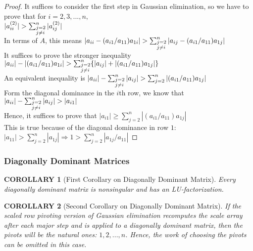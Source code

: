 \documentclass[notheorems,mathserif,table,compress]{beamer}  %
\begin{document}
\begin{frame}
\begin{proof}
It suffices to consider the first step in Gaussian elimination, so we have to prove that for $i=2,3,...,n,$\\
$|a_{ii}^{(2)}|>\sum_{\begin{subarray}{l}
{j=2}\\
j\neq i
\end{subarray}}^n|a_{ij}^{(2)}|$ \\
In terms of $A$, this means $|a_{ii}-(a_{i1}/a_{11})a_{1i}|>\sum_{\begin{subarray}{l}
{j=2}\\
j\neq i
\end{subarray}}^n|a_{ij}-(a_{i1}/a_{11})a_{1j}|$\\
It suffices to prove the stronger inequality $|a_{ii}|-|(a_{i1}/a_{11})a_{1i}|>\sum_{\begin{subarray}{l}
{j=2}\\
j\neq i
\end{subarray}}^n\lbrace|a_{ij}|+|(a_{i1}/a_{11})a_{1j}|\rbrace$\\
An equivalent inequality is $|a_{ii}|-\sum_{\begin{subarray}{l}
{j=2}\\
j\neq i
\end{subarray}}^n|a_{ij}|>\sum_{j=2}^n|(a_{i1}/a_{11})a_{1j}|$\\
Form the diagonal dominance in the $i$th row, we know that $|a_{ii}|-\sum_{\begin{subarray}{l}
{j=2}\\
j\neq i
\end{subarray}}^n|a_{ij}|>|a_{i1}|$\\
Hence, it suffices to prove that $|a_{i1}|\geq\sum_{j=2}^n|(a_{i1}/a_{11})a_{1j}|$\\
This is true because of the diagonal dominance in row $1$: $|a_{11}|>\sum_{j=2}^n|a_{1j}|\Longrightarrow 1>\sum_{j=2}^n|a_{1j}/a_{11}|$
\end{proof}
\end{frame}

\begin{frame}
\frametitle{Diagonally Dominant Matrices}
\newtheorem{corollary}{COROLLARY}
\begin{corollary}[First Corollary on Diagonally Dominant Matrix]
Every diagonally dominant matrix is nonsingular and has an LU-factorization.\\
\end{corollary}

\begin{corollary}[Second Corollary on Diagonally Dominant Matrix]
If the scaled row pivoting version of Gaussian elimination recomputes the scale array after each major step and is applied to a diagonally dominant matrix, then the pivots will be the natural ones: $1, 2,...,n$. Hence, the work of choosing the pivots can be omitted in this case.
\end{corollary}

\end{frame}
\end{document}
